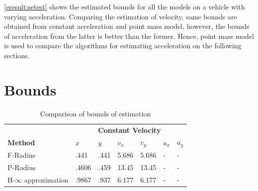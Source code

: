 \ref{eresult:setest} shows the estimated bounds for all the models on a vehicle with varying acceleration. Comparing the estimation of velocity, same bounds are obtained from constant acceleration and point mass model, however, the bounds of acceleration from the latter is better than the former. Hence, point mass model is used to compare the algorithms for estimating acceleration on the following sections.


\section{Bounds}
\begin{table}[htbp]
\caption{Comparison of bounds of estimation\\}
	\centering
	\renewcommand{\arraystretch}{1.1}
	\small	
	\begin{tabular}{l l l l l l l}
		\toprule 
		& \multicolumn{6}{c}{\textbf{Constant Velocity}}\\
		\textbf{Method} & \textbf{$x$} & \textbf{$y$} & \textbf{$v_x$} & \textbf{$v_y$} & \textbf{$a_x$} & \textbf{$a_y$}\\ \midrule
		F-Radius & .441 & .441 & 5.686 & 5.686 & - & -\\
		P-Radius & .4606 & .459 & 13.45 & 13.45 & - &	-\\
		H-$\infty$ approximation & .9867 &	.937 &	6.177 & 6.177 & - &-\\
		
		
		
		
%		
		

\end{tabular}
\end{table}
